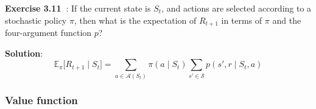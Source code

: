 \textbf{Exercise 3.11~\cite{Sutton1998}}:
If the current state is \( S_t \), and actions are selected according to a stochastic policy \( \pi \), then what is the expectation of \( R_{t+1} \) in terms of \( \pi \) and the four-argument
function \( p \)?

\textbf{Solution}:
\begin{equation*}
    \mathbb{E}_{\pi} \big[ R_{t+1} \mid S_t \big] = \sum_{a \in \mathcal{A}(S_t)} \pi(a \mid S_t) \sum_{s' \in \mathcal{S}} p(s', r \mid S_t, a)
\end{equation*}

\subsubsection{Value function}
